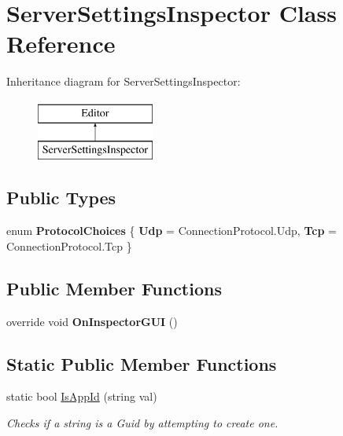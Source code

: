 \hypertarget{class_server_settings_inspector}{}\section{Server\+Settings\+Inspector Class Reference}
\label{class_server_settings_inspector}
Inheritance diagram for Server\+Settings\+Inspector\+:\begin{figure}[H]
\begin{center}
\leavevmode
\includegraphics[height=2.000000cm]{class_server_settings_inspector}
\end{center}
\end{figure}
\subsection*{Public Types}
\begin{DoxyCompactItemize}
\item 
enum {\bfseries Protocol\+Choices} \{ {\bfseries Udp} = Connection\+Protocol.\+Udp, 
{\bfseries Tcp} = Connection\+Protocol.\+Tcp
 \}\hypertarget{class_server_settings_inspector_a926f762456cae88ef59d1b1a948e9ff0}{}\label{class_server_settings_inspector_a926f762456cae88ef59d1b1a948e9ff0}

\end{DoxyCompactItemize}
\subsection*{Public Member Functions}
\begin{DoxyCompactItemize}
\item 
override void {\bfseries On\+Inspector\+G\+UI} ()\hypertarget{class_server_settings_inspector_a8700b5c9f2191179a4eb9af443e8297d}{}\label{class_server_settings_inspector_a8700b5c9f2191179a4eb9af443e8297d}

\end{DoxyCompactItemize}
\subsection*{Static Public Member Functions}
\begin{DoxyCompactItemize}
\item 
static bool \hyperlink{class_server_settings_inspector_a6741c24491cc0260e444d05629ff4871}{Is\+App\+Id} (string val)
\begin{DoxyCompactList}\small\item\em Checks if a string is a Guid by attempting to create one. \end{DoxyCompactList}\end{DoxyCompactItemize}


